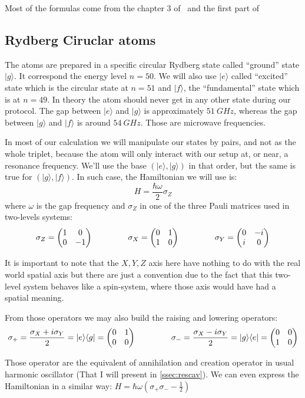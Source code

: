 \documentclass[10pt,a4paper]{report}
\theoremstyle{plain}
\theoremstyle{definition}
\theoremstyle{remark}
\newcommand{\TODO}{\textbf{TODO}}
\newcommand{\ket}[1]{|#1\rangle}
\newcommand{\bra}[1]{\langle#1|}
\newcommand{\mat}[1]{\begin{pmatrix}#1\end{pmatrix}}
\newcommand{\gap}{\hspace{1.5cm}}
\newcommand{\twoline}{\vphantom{\frac\int\int}}
\begin{document}
Most of the formulas come from the chapter 3 of~\cite{Har06} and the first part
of~\cite{SayPHD11}


\subsection{Rydberg Ciruclar atoms}


The atoms are prepared in a specific circular Rydberg state called ``ground'' state
$\ket g$. It correspond the energy level $n = 50$. We will also use $\ket e$
called ``excited'' state which is the circular state at $n = 51$ and $\ket f$, the
``fundamental'' state which is at $n = 49$. In theory the atom should never get
in any other state during our protocol.
The gap between $\ket e$ and $\ket g$ is
approximately $\SI{51}{GHz}$, whereas the gap between $\ket g$ and $\ket f$ is
around $\SI{54}{GHz}$. Those are microwave frequencies.

In most of our calculation we will manipulate our states by pairs, and not as the
whole triplet, because the atom will only interact with our setup at, or near,
a resonance frequency. We'll use the base $(\ket e, \ket g)$ in that order, but
the same is true for $(\ket g, \ket f)$. In such case, the Hamiltonian we will
use is:
\[H = \frac {\hbar \omega}2 \sigma_Z\]
 where $\omega$ is the gap frequency and $\sigma_Z$ in one of the
 three Pauli matrices used in two-levels systems:
\[\twoline \sigma_Z = \mat{1&0\\0&-1} \gap \sigma_X = \mat{0&1\\1&0} \gap
  \sigma_Y = \mat{0&-i\\i&0}\]

It is important to note that the $X,Y,Z$ axis here have nothing to do with the
real world spatial axis but there are just a convention due to the fact that
this two-level system behaves like a spin-system, where those axis would have had a
spatial meaning.

From those operators we may also build the raising and lowering operators:
\[\sigma_+ = \frac{\sigma_X + i \sigma_Y}2 = \ket e \bra g = \mat{0&1\\0&0}
  \gap
  \sigma_- = \frac{\sigma_X - i \sigma_Y}2 = \ket g \bra e= \mat{0&0\\1&0}\]

Those operator are the equivalent of annihilation and creation operator in usual
harmonic oscillator (That I will present in \cref{ssec:rescav}). We can even
express the Hamiltonian in a similar way: $H = \hbar \omega(\sigma_+\sigma_- - \frac12)$
\end{document}
